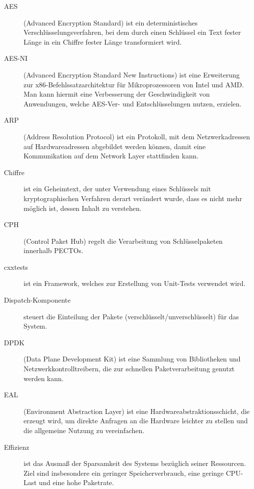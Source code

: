 \documentclass[a4paper, 11pt, ngerman, fleqn]{article}
\begin{document}
\begin{description}
	\item[AES] (Advanced Encryption Standard) ist ein deterministisches Verschlüsselungsverfahren, bei dem durch einen Schlüssel ein Text fester Länge in ein Chiffre fester Länge transformiert wird. 
	
	\item[AES-NI] (Advanced Encryption Standard New Instructions) ist eine Erweiterung zur x86-Befehlssatzarchitektur für Mikroprozessoren von Intel und AMD. Man kann hiermit eine Verbesserung der Geschwindigkeit von Anwendungen, welche AES-Ver- und Entschlüsselungen nutzen, erzielen. 
	
	\item[ARP] (Address Resolution Protocol) ist ein Protokoll, mit dem Netzwerkadressen auf Hardwareadressen abgebildet werden können, damit eine Kommunikation auf dem Network Layer stattfinden kann.  
	
	\item[Chiffre] ist ein Geheimtext, der unter Verwendung eines Schlüssels mit kryptographischen Verfahren derart verändert wurde, dass es nicht mehr möglich ist, dessen Inhalt zu verstehen.
	
	\item[CPH] (Control Paket Hub) regelt die Verarbeitung von Schlüsselpaketen innerhalb PECTOs.
	
	\item[cxxtests] ist ein Framework, welches zur Erstellung von Unit-Tests verwendet wird.
	
	\item[Dispatch-Komponente] steuert die Einteilung der Pakete (verschlüsselt/unverschlüsselt) für das System.
	
	\item[DPDK] (Data Plane Development Kit) ist eine Sammlung von Bibliotheken und Netzwerkkontrolltreibern, die zur schnellen Paketverarbeitung genutzt werden kann.
	
	\item[EAL] (Environment Abstraction Layer) ist eine Hardwareabstraktionsschicht, die erzeugt wird, um direkte Anfragen an die Hardware leichter zu stellen und die allgemeine Nutzung zu vereinfachen.
		
	\item[Effizienz] ist das Ausmaß der Sparsamkeit des Systems bezüglich seiner Ressourcen. Ziel sind insbesondere ein geringer Speicherverbrauch, eine geringe CPU-Last und eine hohe Paketrate.
	

\end{description}
\end{document}
